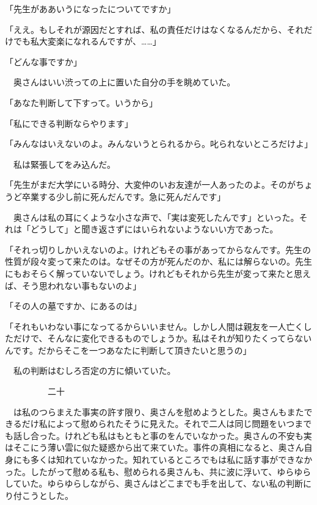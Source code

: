 \documentclass[a4j,onecolumn]{tarticle}
\begin{document}
「先生がああいうになったについてですか」\par{}
「ええ。\hbox{}もしそれが源因だとすれば、\hbox{}私の責任だけはなくなるんだから、\hbox{}それだけでも私大変楽になれるんですが、\hbox{}……」\par{}
「どんな事ですか」\par{}
　奥さんはいい渋っての上に置いた自分の手を眺めていた。\hbox{}\par{}
「あなた判断して下すって。\hbox{}いうから」\par{}
「私にできる判断ならやります」\par{}
「みんなはいえないのよ。\hbox{}みんないうとられるから。\hbox{}叱られないところだけよ」\par{}
　私は緊張してをみ込んだ。\hbox{}\par{}
「先生がまだ大学にいる時分、\hbox{}大変仲のいお友達が一人あったのよ。\hbox{}そのがちょうど卒業する少し前に死んだんです。\hbox{}急に死んだんです」\par{}
　奥さんは私の耳にくような小さな声で、\hbox{}「実は変死したんです」といった。\hbox{}それは「どうして」と聞き返さずにはいられないようないい方であった。\hbox{}\par{}
「それっ切りしかいえないのよ。\hbox{}けれどもその事があってからなんです。\hbox{}先生の性質が段々変って来たのは。\hbox{}なぜその方が死んだのか、\hbox{}私には解らないの。\hbox{}先生にもおそらく解っていないでしょう。\hbox{}けれどもそれから先生が変って来たと思えば、\hbox{}そう思われない事もないのよ」\par{}
「その人の墓ですか、\hbox{}にあるのは」\par{}
「それもいわない事になってるからいいません。\hbox{}しかし人間は親友を一人亡くしただけで、\hbox{}そんなに変化できるものでしょうか。\hbox{}私はそれが知りたくってらないんです。\hbox{}だからそこを一つあなたに判断して頂きたいと思うの」\par{}
　私の判断はむしろ否定の方に傾いていた。\hbox{}\par{}\par{}　　　　　二十
\par{}
　は私のつらまえた事実の許す限り、\hbox{}奥さんを慰めようとした。\hbox{}奥さんもまたできるだけ私によって慰められたそうに見えた。\hbox{}それで二人は同じ問題をいつまでも話し合った。\hbox{}けれども私はもともと事のをんでいなかった。\hbox{}奥さんの不安も実はそこにう薄い雲に似た疑惑から出て来ていた。\hbox{}事件の真相になると、\hbox{}奥さん自身にも多くは知れていなかった。\hbox{}知れているところでもは私に話す事ができなかった。\hbox{}したがって慰める私も、\hbox{}慰められる奥さんも、\hbox{}共に波に浮いて、\hbox{}ゆらゆらしていた。\hbox{}ゆらゆらしながら、\hbox{}奥さんはどこまでも手を出して、\hbox{}ない私の判断にり付こうとした。\hbox{}\par{}
\end{document}
